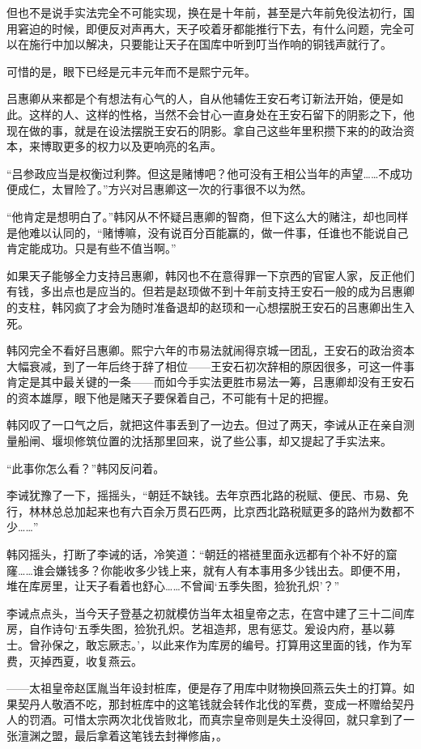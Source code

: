 但也不是说手实法完全不可能实现，换在是十年前，甚至是六年前免役法初行，国用窘迫的时候，即便反对声再大，天子咬着牙都能推行下去，有什么问题，完全可以在施行中加以解决，只要能让天子在国库中听到叮当作响的铜钱声就行了。

可惜的是，眼下已经是元丰元年而不是熙宁元年。

吕惠卿从来都是个有想法有心气的人，自从他辅佐王安石考订新法开始，便是如此。这样的人、这样的性格，当然不会甘心一直身处在王安石留下的阴影之下，他现在做的事，就是在设法摆脱王安石的阴影。拿自己这些年里积攒下来的的政治资本，来博取更多的权力以及更响亮的名声。

“吕参政应当是权衡过利弊。但这是赌博吧？他可没有王相公当年的声望……不成功便成仁，太冒险了。”方兴对吕惠卿这一次的行事很不以为然。

“他肯定是想明白了。”韩冈从不怀疑吕惠卿的智商，但下这么大的赌注，却也同样是他难以认同的，“赌博嘛，没有说百分百能赢的，做一件事，任谁也不能说自己肯定能成功。只是有些不值当啊。”

如果天子能够全力支持吕惠卿，韩冈也不在意得罪一下京西的官宦人家，反正他们有钱，多出点也是应当的。但若是赵顼做不到十年前支持王安石一般的成为吕惠卿的支柱，韩冈疯了才会为随时准备退却的赵顼和一心想摆脱王安石的吕惠卿出生入死。

韩冈完全不看好吕惠卿。熙宁六年的市易法就闹得京城一团乱，王安石的政治资本大幅衰减，到了一年后终于辞了相位——王安石初次辞相的原因很多，可这一件事肯定是其中最关键的一条——而如今手实法更胜市易法一筹，吕惠卿却没有王安石的资本雄厚，眼下他是赌天子要保着自己，不可能有十足的把握。

韩冈叹了一口气之后，就把这件事丢到了一边去。但过了两天，李诫从正在亲自测量船闸、堰坝修筑位置的沈括那里回来，说了些公事，却又提起了手实法来。

“此事你怎么看？”韩冈反问着。

李诫犹豫了一下，摇摇头，“朝廷不缺钱。去年京西北路的税赋、便民、市易、免行，林林总总加起来也有六百余万贯石匹两，比京西北路税赋更多的路州为数都不少……”

韩冈摇头，打断了李诫的话，冷笑道：“朝廷的褡裢里面永远都有个补不好的窟窿……谁会嫌钱多？你能收多少钱上来，就有人有本事用多少钱出去。即便不用，堆在库房里，让天子看着也舒心……不曾闻‘五季失图，猃狁孔炽’？”

李诫点点头，当今天子登基之初就模仿当年太祖皇帝之志，在宫中建了三十二间库房，自作诗句‘五季失图，猃狁孔炽。艺祖造邦，思有惩艾。爰设内府，基以募士。曾孙保之，敢忘厥志。’，以此来作为库房的编号。打算用这里面的钱，作为军费，灭掉西夏，收复燕云。

——太祖皇帝赵匡胤当年设封桩库，便是存了用库中财物换回燕云失土的打算。如果契丹人敬酒不吃，那封桩库中的这笔钱就会转作北伐的军费，变成一杯赠给契丹人的罚酒。可惜太宗两次北伐皆败北，而真宗皇帝则是失土没得回，就只拿到了一张澶渊之盟，最后拿着这笔钱去封禅修庙，。

